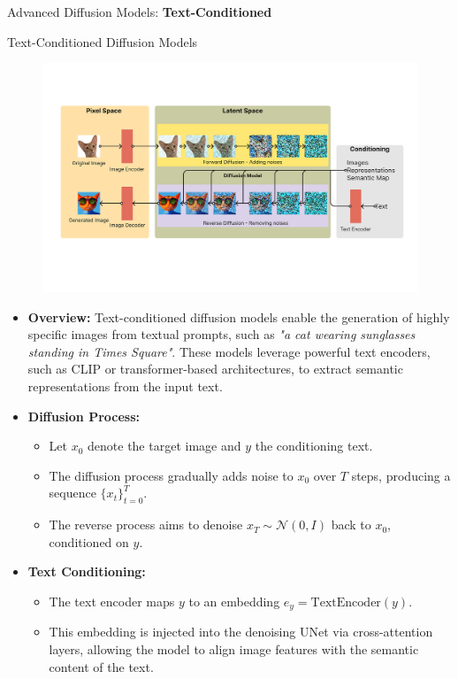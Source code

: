 \begin{frame}{}
    \LARGE Advanced Diffusion Models: \textbf{Text-Conditioned}
\end{frame}

\begin{frame}[allowframebreaks]{Text-Conditioned Diffusion Models}
    \begin{figure}
        \centering
        \includegraphics[width=1.05\linewidth,height=\textheight,keepaspectratio]{images/adv-img-gen/conditioning.png}
    \end{figure}
    \framebreak
\begin{itemize}
    \item \textbf{Overview:} Text-conditioned diffusion models enable the generation of highly specific images from textual prompts, such as \emph{"a cat wearing sunglasses standing in Times Square"}. These models leverage powerful text encoders, such as CLIP or transformer-based architectures, to extract semantic representations from the input text.

    \item \textbf{Diffusion Process:}
    \begin{itemize}
        \item Let $x_0$ denote the target image and $y$ the conditioning text.
        \item The diffusion process gradually adds noise to $x_0$ over $T$ steps, producing a sequence $\{x_t\}_{t=0}^T$.
        \item The reverse process aims to denoise $x_T \sim \mathcal{N}(0, I)$ back to $x_0$, conditioned on $y$.
    \end{itemize}

    \framebreak

    \item \textbf{Text Conditioning:}
    \begin{itemize}
        \item The text encoder maps $y$ to an embedding $e_y = \mathrm{TextEncoder}(y)$.
        \item This embedding is injected into the denoising UNet via cross-attention layers, allowing the model to align image features with the semantic content of the text.
    \end{itemize}


\end{itemize}
\end{frame}
